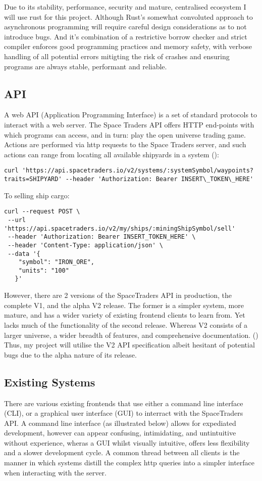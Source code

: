 Due to its stability, performance, security and mature, centralised ecosystem I will use rust for this project. Although Rust’s somewhat convoluted approach to asynchronous programming will require careful design considerations as to not introduce bugs. And it's combination of a restrictive borrow checker and strict compiler enforces good programming practices and memory safety, with verbose handling of all potential errors mitigting the risk of crashes and ensuring programs are always stable, performant and reliable. 

\subsection{API}
A web API (Application Programming Interface) is a set of standard protocols to interact with a web server. The Space Traders API offers HTTP end-points with which programs can access, and in turn: play the open universe trading game. Actions are performed via http requests to the Space Traders server, and such actions can range from locating all available shipyards in a system (\textcite{spacetraders}):
\begin{lstlisting}
curl 'https://api.spacetraders.io/v2/systems/:systemSymbol/waypoints?traits=SHIPYARD' --header 'Authorization: Bearer INSERT\_TOKEN\_HERE'
\end{lstlisting}
To selling ship cargo:

\begin{lstlisting}
curl --request POST \
 --url 'https://api.spacetraders.io/v2/my/ships/:miningShipSymbol/sell'
 --header 'Authorization: Bearer INSERT_TOKEN_HERE' \
 --header 'Content-Type: application/json' \
 --data '{
    "symbol": "IRON_ORE",
    "units": "100"
   }'
\end{lstlisting}

However, there are 2 versions of the SpaceTraders API in production, the complete V1, and the alpha V2 release. The former is a simpler system, more mature, and has a wider variety of existing frontend clients to learn from. Yet lacks much of the functionality of the second release.  Whereas V2 consists of a larger universe, a wider breadth of features, and comprehensive documentation. (\textcite{spacetraders}) Thus, my project will utilise the V2 API specification albeit hesitant of potential bugs due to the alpha nature of its release. 

\subsection{Existing Systems}
There are various existing frontends that use either a command line interface (CLI), or a graphical user interface (GUI) to interract with the SpaceTraders API. A command line interface (as illustrated below) allows for expediated development, however can appear confusing, intimidating, and untintuitive without experience, wheras a GUI whilst visually intuitive, offers less flexibility and a slower development cycle. A common thread between all clients is the manner in which systems distill the complex http queries into a simpler interface when interacting with the server.
\bigskip

